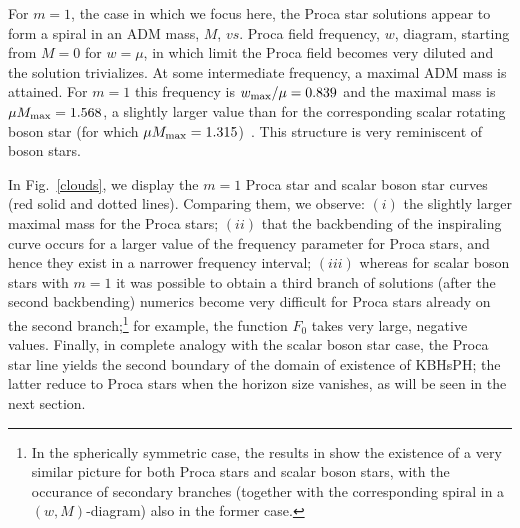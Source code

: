  For $m=1$, the case in which we focus here, the Proca star solutions 
appear to form a spiral in an ADM mass, $M$, $vs.$ Proca field frequency, $w$, diagram, starting from $M=0$ for $w=\mu$, in which limit the Proca field becomes very diluted and the solution trivializes. 
At some intermediate frequency, a maximal ADM mass is attained. For $m=1$ this frequency is $w_{\rm max}/\mu=0.839$ and the maximal mass is $\mu M_{\rm max}=1.568$, a slightly larger value than for the corresponding scalar rotating boson star (for which $\mu M_{\rm max}=1.315$)~\cite{Brito:2015pxa}. 
This structure is very reminiscent of boson stars.
 
In Fig.~\ref{clouds}, we display the $m=1$ Proca star and scalar boson star curves (red solid and dotted lines). Comparing them, we observe: $(i)$ the slightly larger maximal mass for the Proca stars; $(ii)$ that the backbending of the inspiraling curve occurs for a larger value of the frequency parameter for Proca stars, and hence they exist in a narrower frequency interval; $(iii)$ whereas for scalar boson stars with $m=1$ it was possible to obtain a third branch of solutions (after the second backbending) numerics become very difficult for Proca stars already on the second branch;\footnote{In the spherically symmetric case, 
the results in \cite{Brito:2015pxa} show the existence of a very similar picture for both 
  Proca stars and scalar boson stars, with the occurance  of secondary branches (together with the corresponding
spiral in a $(w,M)$-diagram) also in the former case.} for example, 
the function $F_0$ takes very large, negative values.
Finally, in complete analogy with the scalar boson star case, the Proca star line yields the second boundary of the domain of existence of KBHsPH; the latter reduce to Proca stars when the horizon size vanishes, as will be seen in the next section. 

